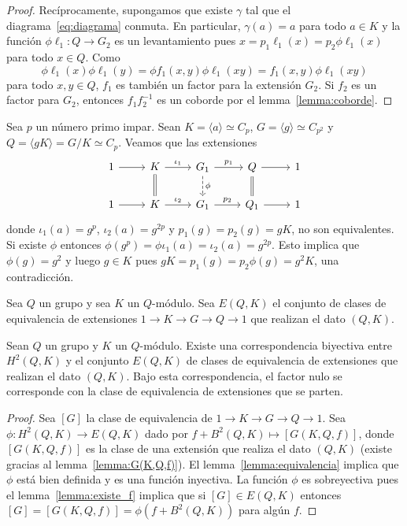 \begin{proof}
	Recíprocamente, supongamos que existe $\gamma$ tal que el
	diagrama~\eqref{eq:diagrama} conmuta. En particular, $\gamma(a)=a$ para
	todo $a\in K$ y la función $\phi\ell_1\colon Q\to G_2$ es un levantamiento pues 
	$x=p_1\ell_1(x)=p_2\phi\ell_1(x)$ 
	para todo $x\in Q$. Como
	\[
	\phi\ell_1(x)\phi\ell_1(y)=\phi f_1(x,y)\phi\ell_1(xy)=f_1(x,y)\phi\ell_1(xy)
	\]
	para todo $x,y\in Q$, $f_1$ es también un factor para la extensión $G_2$.
	Si $f_2$ es un factor para $G_2$, entonces $f_1f_2^{-1}$ es un coborde por
	el lemma~\ref{lemma:coborde}. 
\end{proof}

\begin{example}
	Sea $p$ un número primo impar. Sean $K=\langle a\rangle\simeq C_p$, $G=\langle
	g\rangle\simeq C_{p^2}$ y $Q=\langle gK\rangle=G/K\simeq C_p$.  Veamos que
	las extensiones
	\[
	\begin{tikzcd}
	1 & K & {G_1} & Q & 1 \\
	1 & K & {G_1} & {Q_1} & 1
	\arrow["\iota_1", from=1-2, to=1-3]
	\arrow["{p_1}", from=1-3, to=1-4]
	\arrow[from=1-4, to=1-5]
	\arrow[from=1-1, to=1-2]
	\arrow[from=2-1, to=2-2]
	\arrow["\iota_2", from=2-2, to=2-3]
	\arrow["{p_2}", from=2-3, to=2-4]
	\arrow[from=2-4, to=2-5]
	\arrow[equal, no head, from=1-2, to=2-2]
	\arrow[dashed, "\phi", from=1-3, to=2-3]
	\arrow[equal, from=1-4, to=2-4]
    \end{tikzcd}
    \]	
    donde $\iota_1(a)=g^p$, $\iota_2(a)=g^{2p}$ y $p_1(g)=p_2(g)=gK$, no son
	equivalentes. Si existe $\phi$ entonces
	$\phi(g^p)=\phi\iota_1(a)=\iota_2(a)=g^{2p}$. Esto implica que
	$\phi(g)=g^2$ y luego $g\in K$ pues $gK=p_1(g)=p_2\phi(g)=g^2K$, una
	contradicción. 
\end{example}

Sea $Q$ un grupo y sea $K$ un $Q$-módulo. Sea $E(Q,K)$ el conjunto de clases de
equivalencia de extensiones $1\to K\to G\to Q\to 1$ que realizan el dato $(Q,K)$. 

\begin{theorem}[Schreier]
	\label{theorem:Schreier:extensiones_abelianas}
	Sean $Q$ un grupo y $K$ un $Q$-módulo.  Existe una correspondencia
	biyectiva entre $H^2(Q,K)$ y el conjunto $E(Q,K)$ de clases de equivalencia
	de extensiones que realizan el dato $(Q,K)$. Bajo esta correspondencia, el
	factor nulo se corresponde con la clase de equivalencia de extensiones que
	se parten.
\end{theorem}

\begin{proof}
	Sea $[G]$ la clase de equivalencia de $1\to K\to G\to Q\to 1$. Sea
	$\phi\colon H^2(Q,K)\to E(Q,K)$ dado por $f+B^2(Q,K)\mapsto [G(K,Q,f)]$,
	donde $[G(K,Q,f)]$ es la clase de una extensión que realiza el dato $(Q,K)$
	(existe gracias al lemma~\ref{lemma:G(K,Q,f)}). El
	lemma~\ref{lemma:equivalencia} implica que $\phi$ está bien definida y es
	una función inyectiva. La función $\phi$ es sobreyectiva pues el
	lemma~\ref{lemma:existe_f} implica que si $[G]\in E(Q,K)$ entonces
	$[G]=[G(K,Q,f)]=\phi(f+B^2(Q,K))$ para algún $f$. %
\end{proof}

